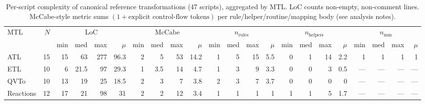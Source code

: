 \begin{table}[t]
\centering
\caption{Per-script complexity of canonical reference transformations (47 scripts), aggregated by MTL. LoC counts non-empty, non-comment lines. McCabe-style metric sums $(1 + \text{explicit control-flow tokens})$ per rule/helper/routine/mapping body (see analysis notes).}
\begin{tabular}{l r rrrr rrrr rrrr rrrr rrrr}
\toprule
MTL & $N$ & \multicolumn{4}{c}{LoC} & \multicolumn{4}{c}{McCabe} & \multicolumn{4}{c}{$n_{\mathrm{rules}}$} & \multicolumn{4}{c}{$n_{\mathrm{helpers}}$} & \multicolumn{4}{c}{$n_{\mathrm{mm}}$} \\
 &  & min & med & max & $\mu$ & min & med & max & $\mu$ & min & med & max & $\mu$ & min & med & max & $\mu$ & min & med & max & $\mu$ \\
\midrule
ATL & 15 & 15 & 63 & 277 & 96.3 & 2 & 5 & 53 & 14.2 & 1 & 5 & 15 & 5.5 & 0 & 1 & 14 & 2.2 & 1 & 1 & 1 & 1 \\
ETL & 10 & 6 & 21.5 & 97 & 29.3 & 1 & 3.5 & 14 & 4.7 & 1 & 3 & 9 & 3.3 & 0 & 0 & 3 & 0.5 & --- & --- & --- & --- \\
QVTo & 10 & 13 & 19 & 25 & 18.5 & 2 & 3 & 7 & 3.8 & 2 & 3 & 7 & 3.7 & 0 & 0 & 0 & 0 & --- & --- & --- & --- \\
Reactions & 12 & 17 & 21 & 98 & 31 & 2 & 2 & 12 & 3.4 & 1 & 1 & 1 & 1 & 1 & 1 & 5 & 1.7 & --- & --- & --- & --- \\
\bottomrule
\end{tabular}
\label{tab:complexity-by-mtl}
\end{table}
